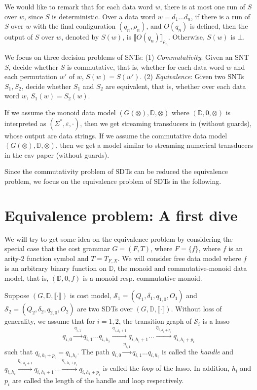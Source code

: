 \documentclass[runningheads,a4paper]{llncs}
\newcommand{\eval}[2]{\llbracket#1\rrbracket_{#2}}
\newcommand\dd{\mathbb{D}}
\newcommand\Ss{\mathcal{S}}
\begin{document}
We would like to remark that for each data word $w$, there is at most one run of $S$ over $w$, since $S$ is deterministic. 
Over a data word $w = d_1 \dots d_n$, if there is a run of $S$ over $w$ with the final configuration $(q_n,\rho_n)$, and $O(q_n)$ is defined, then the output of $S$ over $w$, denoted by ${S}(w)$, is $\eval{O(q_n)}{\rho_n}$. Otherwise, ${S}(w)$ is $\bot$.

We focus on three decision problems of SNTs: (1) \emph{Commutativity}: Given an SNT $S$, decide whether $S$ is commutative, that is, whether for each data word $w$ and each permutation $w'$ of $w$, $S(w)=S(w')$. (2) \emph{Equivalence}: Given two SNTs $S_1,S_2$, decide whether $S_1$ and $S_2$ are equivalent, that is, whether over each data word $w$, $S_1(w)=S_2(w)$.


\begin{example}
If we assume the monoid data model $(G(\otimes), \dd, \otimes)$ where $(\dd, 0, \otimes)$  is interpreted as $(\Sigma^\ast, \varepsilon, \cdot)$, then we get streaming transducers in \cite{RP11} (without guards), whose output are data strings. If we assume the commutative data model $(G(\otimes), \dd, \otimes)$, then we get a model similar to streaming numerical transducers in the cav paper (without guards).
\end{example}

Since the commutativity problem of SDTs can be reduced the equivalence problem, we focus on the equivalence problem of SDTs in the following.

\section{Equivalence problem: A first dive}

We will try to get some idea on the equivalence problem by considering the special case that the cost grammar $G=(F,T)$, where $F=\{f\}$, where $f$ is an arity-2 function symbol and $T = T_{F,X}$. We will consider free data model where $f$ is an arbitrary binary function on $\dd$, the monoid and commutative-monoid data model, that is, $(\dd, 0, f)$ is a monoid resp. commutative monoid.

Suppose $(G, \dd, \llbracket \cdot \rrbracket)$ is cost model, $\Ss_1 = (Q_1, \delta_1, q_{1,0}, O_1)$ and $\Ss_2 = (Q_2, \delta_2, q_{2,0}, O_2)$ are two SDTs over $(G, \dd, \llbracket \cdot \rrbracket)$. Without loss of generality, we assume that for $i=1,2$, the transition graph of $\Ss_i$ is a lasso 
$$q_{i,0} \xrightarrow{\eta_{i,1}} q_{i, 1}  \dots q_{i, h_i} \xrightarrow{\eta_{i, h_i+1}} q_{i, h_i+1} \dots \xrightarrow{\eta_{i, h_i+p_i}} q_{i, h_i+p_i}$$ 
such that $q_{i, h_i+p_i}= q_{i, h_i}$. The path $q_{i,0} \xrightarrow{\eta_{i,1}} q_{i, 1}  \dots q_{i, h_i}$ is called the \emph{handle} and $q_{i, h_i} \xrightarrow{\eta_{i, h_i+1}} q_{i, h_i+1} \dots \xrightarrow{\eta_{i, h_i+p_i}} q_{i, h_i+p_i}$ is called the \emph{loop} of the lasso. In addition, $h_i$ and $p_i$ are called the length of the handle and loop respectively.
\end{document}
